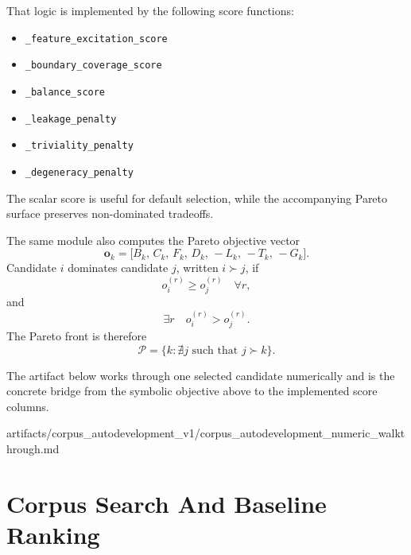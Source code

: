 \documentclass[11pt]{article}
\begin{document}
That logic is implemented by the following score functions:
\begin{itemize}[leftmargin=1.5em]
    \item \texttt{\_feature\allowbreak\_excitation\allowbreak\_score}
    \item \texttt{\_boundary\allowbreak\_coverage\allowbreak\_score}
    \item \texttt{\_balance\allowbreak\_score}
    \item \texttt{\_leakage\allowbreak\_penalty}
    \item \texttt{\_triviality\allowbreak\_penalty}
    \item \texttt{\_degeneracy\allowbreak\_penalty}
\end{itemize}
The scalar score is useful for default selection, while the accompanying Pareto
surface preserves non-dominated tradeoffs.

The same module also computes the Pareto objective vector
\begin{equation}
    \mathbf{o}_k =
    \big[
        B_k,\,
        C_k,\,
        F_k,\,
        D_k,\,
        -L_k,\,
        -T_k,\,
        -G_k
    \big].
\end{equation}
Candidate \(i\) dominates candidate \(j\), written \(i \succ j\), if
\begin{equation}
    o_i^{(r)} \ge o_j^{(r)} \quad \forall r,
\end{equation}
and
\begin{equation}
    \exists r \quad o_i^{(r)} > o_j^{(r)}.
\end{equation}
The Pareto front is therefore
\begin{equation}
    \mathcal{P} = \{k : \nexists j \text{ such that } j \succ k\}.
\end{equation}

The artifact below works through one selected candidate numerically and is the
concrete bridge from the symbolic objective above to the implemented score
columns.
\begin{center}
\footnotesize
\begin{minipage}{0.88\textwidth}
\centering
\ttfamily
artifacts/\allowbreak corpus\_autodevelopment\_v1/\allowbreak corpus\_autodevelopment\_numeric\_walkthrough.md
\end{minipage}
\end{center}

\section{Corpus Search And Baseline Ranking}
\end{document}
